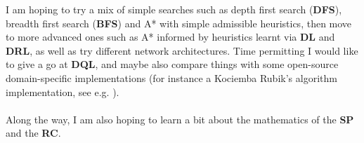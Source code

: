 

I am hoping to try a mix of simple searches such as depth first search (\textbf{DFS}), breadth first search (\textbf{BFS}) and A* with simple admissible heuristics, then move to more advanced ones such as A* informed by heuristics learnt via \textbf{DL} and \textbf{DRL}, as well as try different network architectures. Time permitting I would like to give a go at \textbf{DQL}, and maybe also compare things with some open-source domain-specific implementations (for instance a Kociemba Rubik's algorithm implementation, see e.g. \cite{Kociemba}).
\\
\\
Along the way, I am also hoping to learn a bit about the mathematics of the \textbf{SP} and the \textbf{RC}.
